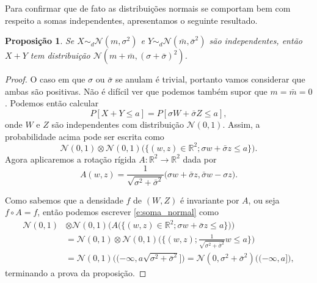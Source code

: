 \documentclass[reqno, final]{book}
\newcommand*\1{\mathds{1}}
\newtheorem{proposition}[theorem]{Proposição}
\def \distr{\sim_d}
\begin{document}
Para confirmar que de fato as distribuições normais se comportam bem com respeito a somas independentes, apresentamos o seguinte resultado.

\begin{proposition}
  \label{p:soma_normais}
  Se $X \distr \mathcal{N}(m, \sigma^2)$ e $Y \distr \mathcal{N}(\bar{m}, \bar{\sigma}^2)$ são independentes, então $X + Y$ tem distribuição $\mathcal{N}(m + \bar{m}, (\sigma + \bar{\sigma})^2)$.
\end{proposition}

\begin{proof}
  O caso em que $\sigma$ ou $\bar{\sigma}$ se anulam é trivial, portanto vamos considerar que ambas são positivas.
  Não é difícil ver que podemos também supor que $m = \bar{m} = 0$.
  Podemos então calcular
  \begin{equation}
    P[X + Y \leq a] = P[\sigma W + \bar{\sigma} Z \leq a],
  \end{equation}
  onde $W$ e $Z$ são independentes com distribuição $\mathcal{N}(0,1)$.
  Assim, a probabilidade acima pode ser escrita como
  \begin{equation}
    \label{e:soma_normal}
    \mathcal{N}(0,1) \otimes \mathcal{N}(0,1) \Big( \big\{ (w,z) \in \mathbb{R}^2; \sigma w + \bar{\sigma} z \leq a \big\} \Big).
  \end{equation}
  Agora aplicaremos a rotação rígida $A: \mathbb{R}^2 \to \mathbb{R}^2$ dada por
  \begin{equation}
    A(w,z) = \frac{1}{\sqrt{\sigma^2 + \bar{\sigma}^2}} \big( \sigma w + \bar{\sigma} z, \bar{\sigma} w - \sigma z \big).
  \end{equation}

  Como sabemos que a densidade $f$ de $(W,Z)$ é invariante por $A$, ou seja $f \circ A = f$, então podemos escrever \eqref{e:soma_normal} como
  \begin{equation*}
    \begin{split}
      \mathcal{N}(0,1) & \otimes \mathcal{N}(0,1) \Big( A \big(\big\{ (w,z) \in \mathbb{R}^2; \sigma w + \bar{\sigma} z \leq a \big\} \big) \Big)\\
      & = \mathcal{N}(0,1) \otimes \mathcal{N}(0,1) \Big( \Big\{(w,z); \frac{1}{\sqrt{\sigma^2 + \bar{\sigma}^2}}w \leq a \Big\} \Big)\\
      & = \mathcal{N}(0,1) \big( (-\infty, a \sqrt{\sigma^2 + \bar{\sigma}^2} \big] \big) = \mathcal{N}(0,\sigma^2 + \bar{\sigma}^2) \big( (-\infty, a \big] \big),
    \end{split}
  \end{equation*}
  terminando a prova da proposição.
\end{proof}
\end{document}
